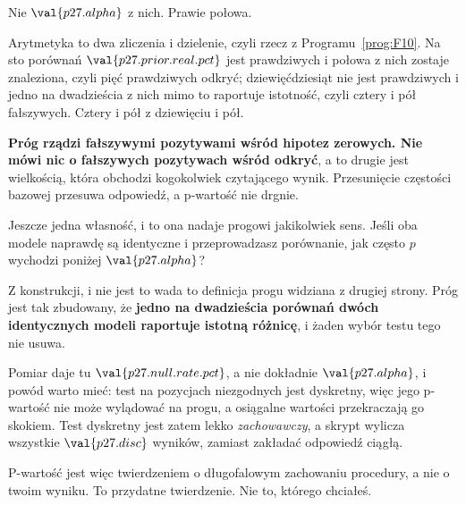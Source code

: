 \begin{fr}

Nie $\val{p27.alpha}$ z nich. Prawie połowa.

Arytmetyka to dwa zliczenia i dzielenie, czyli rzecz z
Programu~\ref{prog:F10}. Na sto porównań $\val{p27.prior.real.pct}$ jest
prawdziwych i połowa z nich zostaje znaleziona, czyli pięć prawdziwych
odkryć; dziewięćdziesiąt nie jest prawdziwych i jedno na dwadzieścia z nich
mimo to raportuje istotność, czyli cztery i pół fałszywych. Cztery i pół z
dziewięciu i pół.

\textbf{Próg rządzi fałszywymi pozytywami wśród hipotez zerowych. Nie mówi nic
o fałszywych pozytywach wśród odkryć}, a to drugie jest wielkością, która
obchodzi kogokolwiek czytającego wynik. Przesunięcie częstości bazowej
przesuwa odpowiedź, a p-wartość nie drgnie.
\end{fr}

\begin{fr}
Jeszcze jedna własność, i to ona nadaje progowi jakikolwiek sens. Jeśli oba
modele naprawdę są identyczne i przeprowadzasz porównanie, jak często $p$
wychodzi poniżej $\val{p27.alpha}$?
\dotline
\nextframe
\end{fr}

\begin{fr}

Z konstrukcji, i nie jest to wada \dash{} to definicja progu widziana z drugiej
strony. Próg jest tak zbudowany, że \textbf{jedno na dwadzieścia porównań dwóch
identycznych modeli raportuje istotną różnicę}, i żaden wybór testu tego nie
usuwa.

Pomiar daje tu $\val{p27.null.rate.pct}$, a nie dokładnie $\val{p27.alpha}$, i
powód warto mieć: test na pozycjach niezgodnych jest dyskretny, więc jego
p-wartość nie może wylądować na progu, a osiągalne wartości przekraczają go
skokiem. Test dyskretny jest zatem lekko \emph{zachowawczy}, a skrypt wylicza
wszystkie $\val{p27.disc}$ wyników, zamiast zakładać odpowiedź ciągłą.

P-wartość jest więc twierdzeniem o długofalowym zachowaniu procedury, a nie o
twoim wyniku. To przydatne twierdzenie. Nie to, którego chciałeś.
\end{fr}


